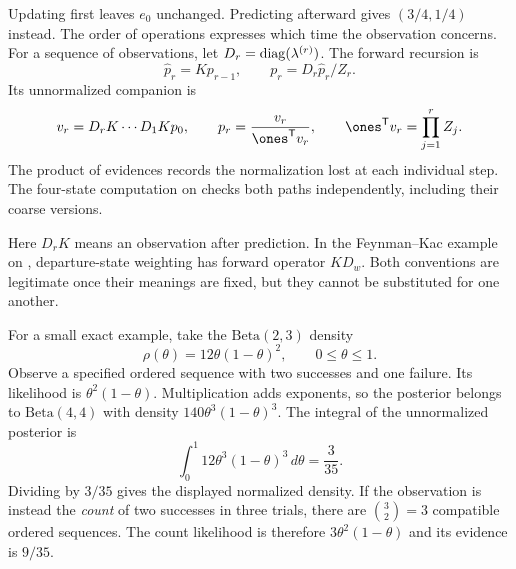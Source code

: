 Updating first leaves $e_0$ unchanged. Predicting afterward gives $(3/4,1/4)$ instead. The order of operations expresses which time the observation concerns.
For a sequence of observations, let $D_r=\operatorname{diag}(\lambda^{(r)})$. The forward recursion is
\[
\widehat p_r=Kp_{r-1},\qquad p_r=D_r\widehat p_r/Z_r.
\]
Its unnormalized companion is
\[
v_r=D_rK\cdots D_1Kp_0,
\qquad p_r=\frac{v_r}{\ones^{\mathsf T}v_r},
\qquad \ones^{\mathsf T}v_r=\prod_{j=1}^r Z_j.
\]
The product of evidences records the normalization lost at each individual step. The four-state computation on  checks both paths independently, including their coarse versions.

Here $D_rK$ means an observation after prediction. In the Feynman--Kac example on , departure-state weighting has forward operator $K D_w$. Both conventions are legitimate once their meanings are fixed, but they cannot be substituted for one another.

For a small exact example, take the $\mathrm{Beta}(2,3)$ density
\[
\rho(\theta)=12\theta(1-\theta)^2,\qquad0\le\theta\le1.
\]
Observe a specified ordered sequence with two successes and one failure. Its likelihood is $\theta^2(1-\theta)$. Multiplication adds exponents, so the posterior belongs to $\mathrm{Beta}(4,4)$ with density $140\theta^3(1-\theta)^3$.
The integral of the unnormalized posterior is
\[
\int_0^1 12\theta^3(1-\theta)^3\,d\theta=\frac3{35}.
\]
Dividing by $3/35$ gives the displayed normalized density. If the observation is instead the \emph{count} of two successes in three trials, there are $\binom32=3$ compatible ordered sequences. The count likelihood is therefore $3\theta^2(1-\theta)$ and its evidence is $9/35$.

